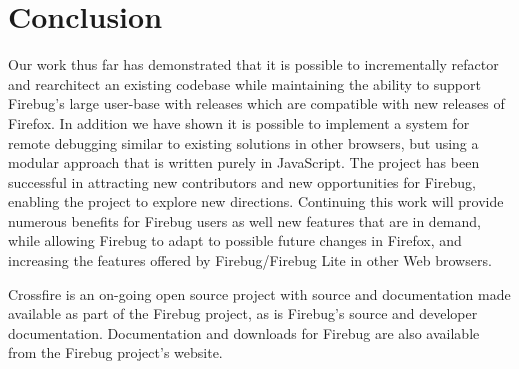 \section{Conclusion}
Our work thus far has demonstrated that it is possible to incrementally refactor
and rearchitect an existing codebase while maintaining the ability to support
Firebug's large user-base with releases which are compatible with new releases
of Firefox. In addition we have shown it is possible to implement a system for
remote debugging similar to existing solutions in other browsers, but using a
modular approach that is written purely in JavaScript. The project has been
successful in attracting new contributors and new opportunities for Firebug,
enabling the project to explore new directions. Continuing this work will
provide numerous benefits for Firebug users as well new features that are in
demand, while allowing Firebug to adapt to possible future changes in Firefox,
and increasing the features offered by Firebug/Firebug Lite in other Web
browsers.

Crossfire is an on-going open source project with source\cite{crossfire-src}
and documentation\cite{crossfire-doc} made available as part of the Firebug
project, as is Firebug's source\cite{firebug-src} and developer
documentation\cite{firebug-doc}. Documentation and downloads for Firebug are
also available from the Firebug project's website.\cite{getfirebug}
